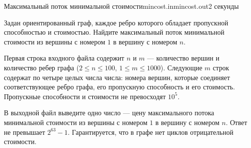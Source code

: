 \begin{problem}{Максимальный поток минимальной стоимости}{mincost.in}{mincost.out}{2 секунды}

Задан ориентированный граф, каждое ребро которого обладает пропускной способностью и стоимостью.
Найдите максимальный поток минимальной стоимости  из вершины с номером  $1$ в вершину с номером $n$.

\InputFile

Первая строка входного файла содержит $n$ и $m$ --- количество
вершин и количество ребер графа ($2 \le n \le 100$,
$1 \le m \le 1000$). 
Следующие $m$ строк содержат по четыре целых числа числа:
номера вершин, которые соединяет соответствующее ребро графа, 
его пропускную способность и его стоимость.
Пропускные способности и стоимости не превосходят $10^5$.

\OutputFile

В выходной файл выведите одно число --- 
цену максимального потока минимальной стоимости  из вершины с номером  $1$ в вершину с номером $n$.
Ответ не превышает $2^{63} - 1$. Гарантируется, что в графе нет циклов отрицательной стоимости.

\Examples

\begin{example}
%
\end{example}

\end{problem}
                                                 
